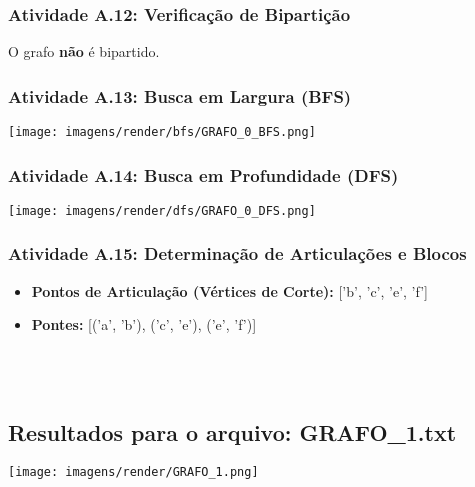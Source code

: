 \documentclass[a4paper,12pt]{article}
\begin{document}
\subsubsection*{Atividade A.12: Verificação de Bipartição}
O grafo \textbf{não} é bipartido.

\subsubsection*{Atividade A.13: Busca em Largura (BFS)}
\begin{center}
    \texttt{[image: imagens/render/bfs/GRAFO\_0\_BFS.png]}
\end{center}

\subsubsection*{Atividade A.14: Busca em Profundidade (DFS)}
\begin{center}
    \texttt{[image: imagens/render/dfs/GRAFO\_0\_DFS.png]}
\end{center}

\subsubsection*{Atividade A.15: Determinação de Articulações e Blocos}
\begin{itemize}[nosep, leftmargin=*]
    \item \textbf{Pontos de Articulação (Vértices de Corte):} ['b', 'c', 'e', 'f']
    \item \textbf{Pontes:} [('a', 'b'), ('c', 'e'), ('e', 'f')]
\end{itemize}

\\ \\

\subsection{Resultados para o arquivo: GRAFO\_1.txt}

\begin{center}
    \texttt{[image: imagens/render/GRAFO\_1.png]}
\end{center}
\end{document}
